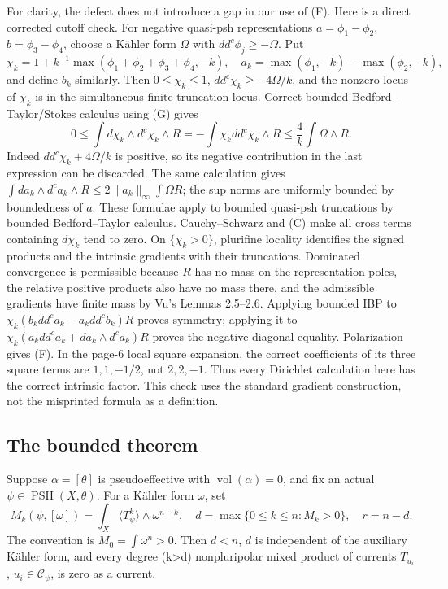 \documentclass[
  11pt,
]{article}
\begin{document}
For clarity, the defect does not introduce a gap in our use of (F). Here
is a direct corrected cutoff check. For negative quasi-psh
representations \(a=\phi_1-\phi_2\), \(b=\phi_3-\phi_4\), choose a
Kähler form \(\Omega\) with \(dd^c\phi_j\geq-\Omega\). Put \[
\chi_k=1+k^{-1}\max(\phi_1+\phi_2+\phi_3+\phi_4,-k),\quad
a_k=\max(\phi_1,-k)-\max(\phi_2,-k),
\] and define \(b_k\) similarly. Then \(0\leq\chi_k\leq1\),
\(dd^c\chi_k\geq-4\Omega/k\), and the nonzero locus of \(\chi_k\) is in the
simultaneous finite truncation locus. Correct bounded
Bedford--Taylor/Stokes calculus using (G) gives \[
0\leq\int d\chi_k\wedge d^c\chi_k\wedge R
=-\int\chi_kdd^c\chi_k\wedge R
\leq\frac4k\int\Omega\wedge R.
\tag{C}
\] Indeed \(dd^c\chi_k+4\Omega/k\) is positive, so its negative
contribution in the last expression can be discarded. The same
calculation gives
\(\int da_k\wedge d^ca_k\wedge R\leq2\|a_k\|_\infty\int\Omega R\); the
sup norms are uniformly bounded by boundedness of \(a\). These formulae
apply to bounded quasi-psh truncations by bounded Bedford--Taylor
calculus. Cauchy--Schwarz and (C) make all cross terms containing
\(d\chi_k\) tend to zero. On \(\{\chi_k>0\}\), plurifine locality
identifies the signed products and the intrinsic gradients with their
truncations. Dominated convergence is permissible because \(R\) has no
mass on the representation poles, the relative positive products also
have no mass there, and the admissible gradients have finite mass by
Vu's Lemmas 2.5--2.6. Applying bounded IBP to
\(\chi_k(b_kdd^ca_k-a_kdd^cb_k)R\) proves symmetry; applying it to
\(\chi_k(a_kdd^ca_k+da_k\wedge d^ca_k)R\) proves the negative diagonal
equality. Polarization gives (F). In the page-6 local square expansion,
the correct coefficients of its three square terms are \(1,1,-1/2\), not
\(2,2,-1\). Thus every Dirichlet calculation here has the correct
intrinsic factor. This check uses the standard gradient construction,
not the misprinted formula as a definition.

\subsection{The bounded theorem}\label{the-bounded-theorem}

Suppose \(\alpha=[\theta]\) is pseudoeffective with
\(\operatorname{vol}(\alpha)=0\), and fix an actual
\(\psi\in\operatorname{PSH}(X,\theta)\). For a Kähler form \(\omega\),
set \[
M_k(\psi,[\omega])=\int_X\langle T_\psi^k\rangle\wedge\omega^{n-k},\quad
d=\max\{0\leq k\leq n:M_k>0\},\quad r=n-d.
\tag{1}
\] The convention is \(M_0=\int\omega^n>0\). Then \(d<n\), \(d\) is
independent of the auxiliary Kähler form, and every degree
(k\textgreater d) nonpluripolar mixed product of currents \(T_{u_i}\),
\(u_i\in\mathcal{C}_\psi\), is zero as a current.
\end{document}
